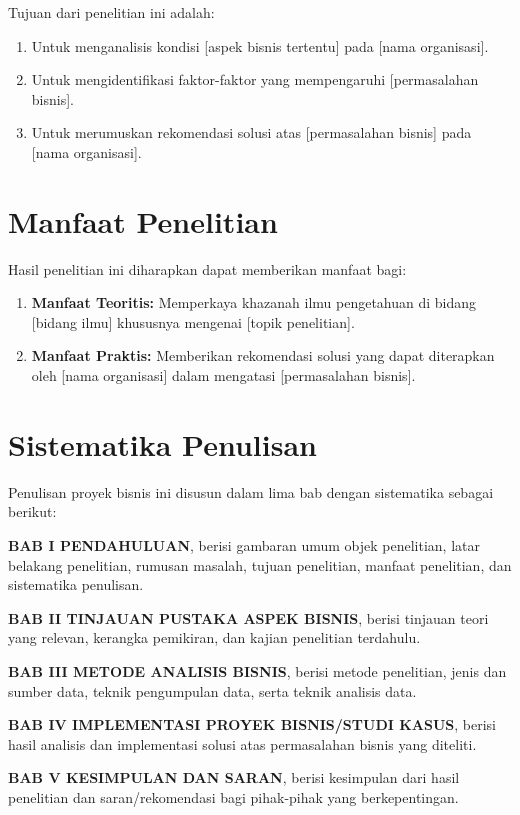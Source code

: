 Tujuan dari penelitian ini adalah:

\begin{enumerate}
  \item Untuk menganalisis kondisi [aspek bisnis tertentu] pada [nama organisasi].
  \item Untuk mengidentifikasi faktor-faktor yang mempengaruhi [permasalahan bisnis].
  \item Untuk merumuskan rekomendasi solusi atas [permasalahan bisnis] pada [nama organisasi].
\end{enumerate}

\section{Manfaat Penelitian}
\label{sec:manfaat-pb}

Hasil penelitian ini diharapkan dapat memberikan manfaat bagi:

\begin{enumerate}
  \item \textbf{Manfaat Teoritis:} Memperkaya khazanah ilmu pengetahuan di bidang
        [bidang ilmu] khususnya mengenai [topik penelitian].

  \item \textbf{Manfaat Praktis:} Memberikan rekomendasi solusi yang dapat diterapkan
        oleh [nama organisasi] dalam mengatasi [permasalahan bisnis].
\end{enumerate}

\section{Sistematika Penulisan}
\label{sec:sistematika-pb}

Penulisan proyek bisnis ini disusun dalam lima bab dengan sistematika sebagai berikut:

\textbf{BAB I PENDAHULUAN}, berisi gambaran umum objek penelitian, latar belakang
penelitian, rumusan masalah, tujuan penelitian, manfaat penelitian, dan sistematika
penulisan.

\textbf{BAB II TINJAUAN PUSTAKA ASPEK BISNIS}, berisi tinjauan teori yang relevan,
kerangka pemikiran, dan kajian penelitian terdahulu.

\textbf{BAB III METODE ANALISIS BISNIS}, berisi metode penelitian, jenis dan sumber
data, teknik pengumpulan data, serta teknik analisis data.

\textbf{BAB IV IMPLEMENTASI PROYEK BISNIS/STUDI KASUS}, berisi hasil analisis dan
implementasi solusi atas permasalahan bisnis yang diteliti.

\textbf{BAB V KESIMPULAN DAN SARAN}, berisi kesimpulan dari hasil penelitian dan
saran/rekomendasi bagi pihak-pihak yang berkepentingan.
